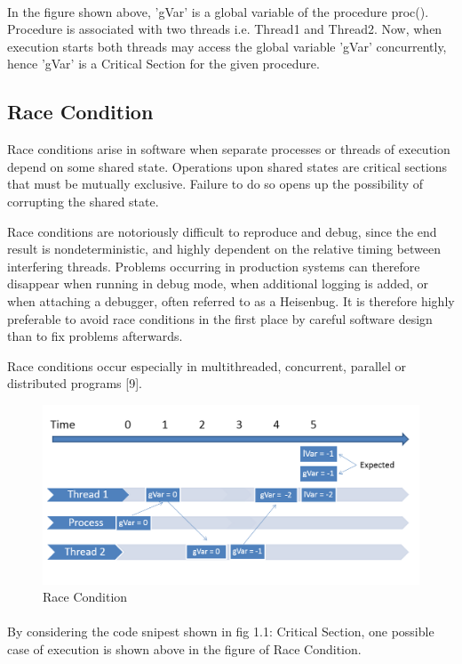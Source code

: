 \paragraph{}
In the figure shown above, 'gVar' is a global variable of the procedure proc(). Procedure is associated with two threads i.e. Thread1 and Thread2. Now, when execution starts both threads may access the global variable 'gVar' concurrently, hence 'gVar' is a Critical Section for the given procedure.

\subsection{Race Condition}
Race conditions arise in software when separate processes or threads of execution depend on some shared state. Operations upon shared states are critical sections that must be mutually exclusive. Failure to do so opens up the possibility of corrupting the shared state.

Race conditions are notoriously difficult to reproduce and debug, since the end result is nondeterministic, and highly dependent on the relative timing between interfering threads. Problems occurring in production systems can therefore disappear when running in debug mode, when additional logging is added, or when attaching a debugger, often referred to as a Heisenbug. It is therefore highly preferable to avoid race conditions in the first place by careful software design than to fix problems afterwards.

Race conditions occur especially in multithreaded, concurrent, parallel or distributed programs [9].
\begin{figure}[H]
\centering
\includegraphics[scale=0.5]{race_condition.png}
\caption{Race Condition}
\label{<<Label>>}
\end{figure}
\paragraph{}
By considering the code snipest shown in fig 1.1: Critical Section, one possible case of execution is shown above in the figure of Race Condition. 
